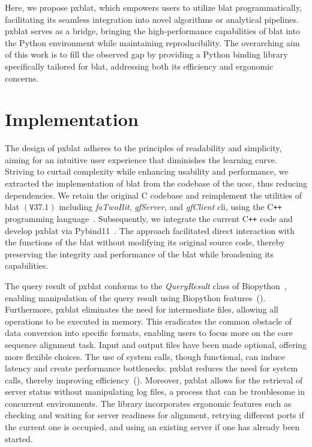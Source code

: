 \documentclass[unnumsec,webpdf,contemporary,large,namedate]{oup-authoring-template}%
\theoremstyle{thmstyleone}%
\theoremstyle{thmstyletwo}%
\theoremstyle{thmstylethree}%
\newcommand\pCref[1]{(\Cref{#1})}
\begin{document}
Here, we propose \gls{pxblat}, which empowers users to utilize \gls{blat} programmatically, facilitating its seamless integration into novel algorithms or analytical pipelines.
\gls{pxblat} serves as a bridge, bringing the high-performance capabilities of \gls{blat} into the Python environment while maintaining reproducibility.
The overarching aim of this work is to fill the observed gap by providing a Python binding library specifically tailored for \gls{blat}, addressing both its efficiency and ergonomic concerns.

\section{Implementation}\label{sec:implementation}

The design of \gls{pxblat} adheres to the principles of readability and simplicity, aiming for an intuitive user experience that diminishes the learning curve.
Striving to curtail complexity while enhancing usability and performance, we extracted the implementation of \gls{blat} from the codebase of the \gls{ucsc}, thus reducing dependencies.
We retain the original C codebase and reimplement the utilities of \gls{blat} \(\left(\mathtt{V}37.1\right)\) including \emph{faTwoBit}, \emph{gfServer}, and \emph{gfClient} \gls{cli}, using the C\texttt{++} programming language~\citep{kent2002blat}.
Subsequently, we integrate the current C\texttt{++} code and develop \gls{pxblat} via Pybind11~\citep{pybind11}.
The approach facilitated direct interaction with the functions of the \gls{blat} without modifying its original source code, thereby preserving the integrity and performance of the \gls{blat} while broadening its capabilities.

The query result of \gls{pxblat} conforms to the \emph{QueryResult} class of Biopython~\citep{cock2009biopython}, enabling  manipulation of the query result using Biopython features~\pCref{listing:example}.
Furthermore, \gls{pxblat} eliminates the need for intermediate files, allowing all operations to be executed in memory.
This eradicates the common obstacle of data conversion into specific formats, enabling users to focus more on the core sequence alignment task.
Input and output files have been made optional, offering more flexible choices.
The use of system calls, though functional, can induce latency and create performance bottlenecks.
\gls{pxblat} reduces the need for system calls, thereby improving efficiency~\pCref{tab:performance-evaluation}.
Moreover, \gls{pxblat} allows for the retrieval of server status without manipulating log files, a process that can be troublesome in concurrent environments.
The library incorporates ergonomic features such as checking and waiting for server readiness for alignment, retrying different ports if the current one is occupied, and using an existing server if one has already been started.
\end{document}
